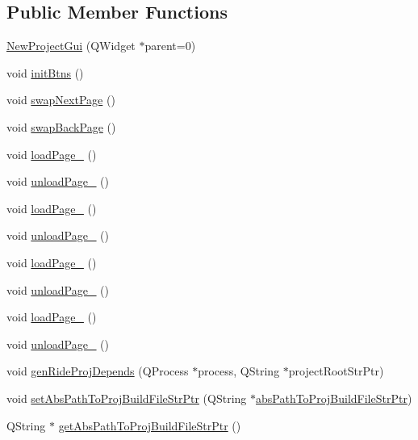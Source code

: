 \subsection*{Public Member Functions}
\begin{DoxyCompactItemize}
\item 
\hyperlink{class_new_project_gui_a477f5d0a5d466be598b3bdf55d22b7f1}{New\-Project\-Gui} (Q\-Widget $\ast$parent=0)
\item 
void \hyperlink{class_new_project_gui_a5822d7472aff8da63b822e09afa481e1}{init\-Btns} ()
\item 
void \hyperlink{class_new_project_gui_ae56f35367fded2e1d303312cbc0549e1}{swap\-Next\-Page} ()
\item 
void \hyperlink{class_new_project_gui_ac04edf99653bbc5881e3cba6b385e967}{swap\-Back\-Page} ()
\item 
void \hyperlink{class_new_project_gui_a71cc5704a7e11e7344cf2cbb04f44097}{load\-Page\-\_} ()
\item 
void \hyperlink{class_new_project_gui_a09eaf9bcd77d5625a47b34113c87ac91}{unload\-Page\-\_} ()
\item 
void \hyperlink{class_new_project_gui_ac81882c81a3315a48634fa0f2a84f6a5}{load\-Page\-\_} ()
\item 
void \hyperlink{class_new_project_gui_a34be4c9396d11e877fab6da78edba5a8}{unload\-Page\-\_} ()
\item 
void \hyperlink{class_new_project_gui_afe4d4300c0272c14069daf81a6d2f47f}{load\-Page\-\_} ()
\item 
void \hyperlink{class_new_project_gui_a1ec5cfd09dfc43a0d4aac473cf215a04}{unload\-Page\-\_} ()
\item 
void \hyperlink{class_new_project_gui_a92027285ea0ec685ebef5b62afb4e4eb}{load\-Page\-\_} ()
\item 
void \hyperlink{class_new_project_gui_a251eaaea1f985069babb7a203de852db}{unload\-Page\-\_} ()
\item 
void \hyperlink{class_new_project_gui_a5dac69b4d7cd4a6d0beb033f5406825b}{gen\-Ride\-Proj\-Depends} (Q\-Process $\ast$process, Q\-String $\ast$project\-Root\-Str\-Ptr)
\item 
void \hyperlink{class_new_project_gui_ad50f7b147c3b3dc97ca92cc6c7b805f0}{set\-Abs\-Path\-To\-Proj\-Build\-File\-Str\-Ptr} (Q\-String $\ast$\hyperlink{class_new_project_gui_aa985b9da4028bea4f10e76d116955c4e}{abs\-Path\-To\-Proj\-Build\-File\-Str\-Ptr})
\item 
Q\-String $\ast$ \hyperlink{class_new_project_gui_a7a9884b9659412ddf26ec7b59fe2edb5}{get\-Abs\-Path\-To\-Proj\-Build\-File\-Str\-Ptr} ()

\end{DoxyCompactItemize}

